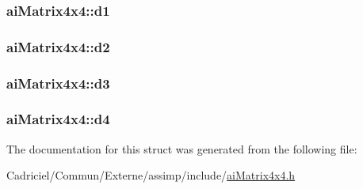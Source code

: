 \hypertarget{structai_matrix4x4_a13f3800d9106e3be6d0e60b794c5a5ae}{
\subsubsection[{d1}]{ ai\-Matrix4x4\-::d1}}\label{structai_matrix4x4_a13f3800d9106e3be6d0e60b794c5a5ae}
\hypertarget{structai_matrix4x4_a6f17ca1c7e4b9377d0e332f85aab282b}{
\subsubsection[{d2}]{ ai\-Matrix4x4\-::d2}}\label{structai_matrix4x4_a6f17ca1c7e4b9377d0e332f85aab282b}
\hypertarget{structai_matrix4x4_a8d2910f62b34b1e2ace93b55e4db4b92}{
\subsubsection[{d3}]{ ai\-Matrix4x4\-::d3}}\label{structai_matrix4x4_a8d2910f62b34b1e2ace93b55e4db4b92}
\hypertarget{structai_matrix4x4_ac0a65b51f126f7331b4f7dbbd82f3d63}{
\subsubsection[{d4}]{ ai\-Matrix4x4\-::d4}}\label{structai_matrix4x4_ac0a65b51f126f7331b4f7dbbd82f3d63}


The documentation for this struct was generated from the following file\-:\begin{DoxyCompactItemize}
\item 
Cadriciel/\-Commun/\-Externe/assimp/include/\hyperlink{ai_matrix4x4_8h}{ai\-Matrix4x4.\-h}\end{DoxyCompactItemize}
